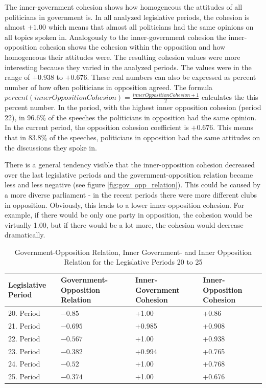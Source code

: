 The inner-government cohesion shows how homogeneous the attitudes of all politicians in government is. In all analyzed legislative periods, the cohesion is almost $+1.00$ which means that almost all politicians had the same opinions on all topics spoken in. Analogously to the inner-government cohesion the inner-opposition cohesion shows the cohesion within the opposition and how homogeneous their attitudes were. The resulting cohesion values were more interesting because they varied in the analyzed periods. The values were in the range of $+0.938$ to $+0.676$. 
These real numbers can also be expressed as percent number of how often politicians in opposition agreed. The formula $percent(innerOppositionCohesion) = \frac{innerOppositionCohesion + 1}{2}$ calculates the this percent number.
 In the period, with the highest inner opposition cohesion (period 22), in 96.6\% of the speeches the politicians in opposition had the same opinion. In the current period, the opposition cohesion coefficient is $+0.676$. This means that in 83.8\% of the speeches, politicians in opposition had the same attitudes on the discussions they spoke in.

There is a general tendency visible that the inner-opposition cohesion decreased over the last legislative periods and the government-opposition relation became less and less negative (see figure \ref{fig:gov_opp_relation}). This could be caused by a more diverse parliament - in the recent periods there were more different clubs in opposition. Obviously, this leads to a lower inner-opposition cohesion. For example, if there would be only one party in opposition, the cohesion would be virtually 1.00, but if there would be a lot more, the cohesion would decrease dramatically.

\begin{table}

\centering
\bgroup
\def\arraystretch{1.2}
\begin{tabular}{| p{2cm} | p{3cm} | p{3cm} | p{3cm} |}
\hline
  Legislative Period & Government-Opposition Relation & Inner-Government Cohesion & Inner-Opposition Cohesion \\
\hline
\hline
  20. Period & $-0.85$ & +1.00 & +0.86 \\
\hline
  21. Period & $-0.695$ & +0.985 & +0.908 \\
\hline
  22. Period & $-0.567$ & +1.00 & +0.938 \\
\hline
  23. Period & $-0.382$ & +0.994 & +0.765\\
\hline
  24. Period & $-0.52$ & +1.00 & +0.768\\
\hline
  25. Period & $-0.374$ & +1.00 & +0.676\\
\hline

\end{tabular}
\egroup
\caption{Government-Opposition Relation, Inner Government- and Inner Opposition Relation for the Legislative Periods 20 to 25}
\label{table:gov_opp_relation}
\end{table}

